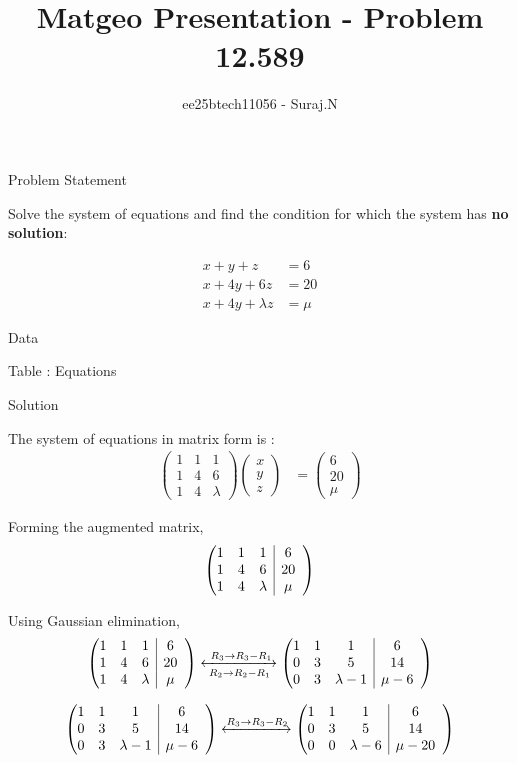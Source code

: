 \documentclass{beamer}
\title{Matgeo Presentation - Problem 12.589}
\author{ee25btech11056 - Suraj.N}
\makeatletter
\numberwithin{equation}{section}
\theoremstyle{remark}
\newcommand{\myvec}[1]{\ensuremath{\begin{pmatrix}#1\end{pmatrix}}}
\newenvironment{amatrix}[1]{%
  \left(\begin{array}{@{}*{#1}{c}|*{#1}{c}@{}}
}{%
  \end{array}\right)
}
\newcommand{\myaugvec}[2]{\ensuremath{\begin{amatrix}{#1}#2\end{amatrix}}}
\makeatother
\begin{document}
\begin{frame}
  \titlepage
\end{frame}

\begin{frame}{Problem Statement}

Solve the system of equations and find the condition for which the system has \textbf{no solution}:

\begin{align*}
x+y+z &= 6 \\
x+4y+6z &= 20 \\
x+4y+\lambda z &= \mu
\end{align*}

\end{frame}

\begin{frame}{Data}

\begin{table}[h!]
  \centering
  
  \caption*{Table : Equations}
  \label{12.589}
\end{table}

\end{frame}

\begin{frame}{Solution}

The system of equations in matrix form is :
\begin{align}
\myvec{1 & 1 & 1\\1 & 4 & 6\\1 & 4 & \lambda}\myvec{x\\y\\z} &= \myvec{6\\20\\\mu}
\end{align}

Forming the augmented matrix,
\begin{align}
\myaugvec{3}{1 & 1 & 1 & 6\\1 & 4 & 6 & 20\\1 & 4 & \lambda & \mu}
\end{align}

Using Gaussian elimination,
\begin{align}
\myaugvec{3}{1 & 1 & 1 & 6\\1 & 4 & 6 & 20\\1 & 4 & \lambda & \mu}
\xleftrightarrow[\;R_2 \to R_2 - R_1\;]{\;R_3 \to R_3 - R_1}
\myaugvec{3}{1 & 1 & 1 & 6\\0 & 3 & 5 & 14\\0 & 3 & \lambda-1 & \mu-6}
\end{align}

\begin{align}
\myaugvec{3}{1 & 1 & 1 & 6\\0 & 3 & 5 & 14\\0 & 3 & \lambda-1 & \mu-6}
\xleftrightarrow{R_3 \to R_3 - R_2}
\myaugvec{3}{1 & 1 & 1 & 6\\0 & 3 & 5 & 14\\0 & 0 & \lambda-6 & \mu-20}
\end{align}

\end{frame}
\end{document}
